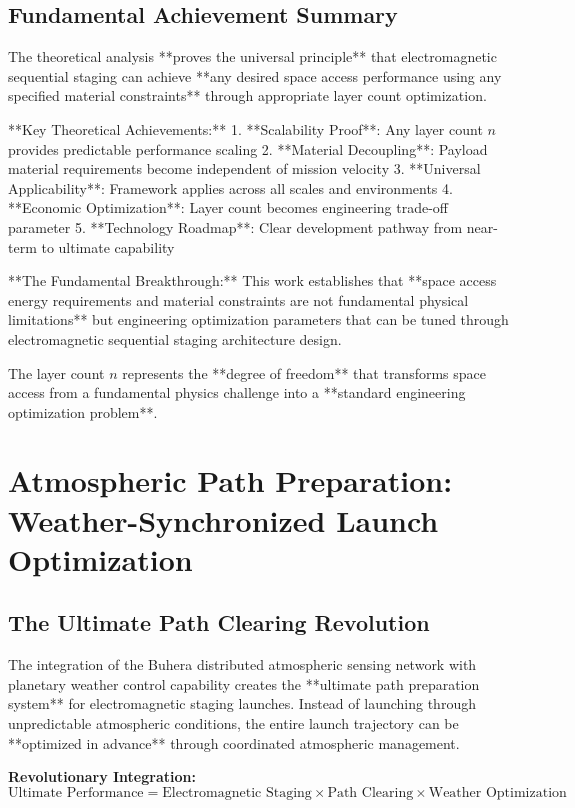 \documentclass[12pt,a4paper]{article}
\begin{document}
\subsection{Fundamental Achievement Summary}

The theoretical analysis **proves the universal principle** that electromagnetic sequential staging can achieve **any desired space access performance using any specified material constraints** through appropriate layer count optimization.

**Key Theoretical Achievements:**
1. **Scalability Proof**: Any layer count $n$ provides predictable performance scaling
2. **Material Decoupling**: Payload material requirements become independent of mission velocity
3. **Universal Applicability**: Framework applies across all scales and environments
4. **Economic Optimization**: Layer count becomes engineering trade-off parameter
5. **Technology Roadmap**: Clear development pathway from near-term to ultimate capability

**The Fundamental Breakthrough:**
This work establishes that **space access energy requirements and material constraints are not fundamental physical limitations** but engineering optimization parameters that can be tuned through electromagnetic sequential staging architecture design.

The layer count $n$ represents the **degree of freedom** that transforms space access from a fundamental physics challenge into a **standard engineering optimization problem**.

\section{Atmospheric Path Preparation: Weather-Synchronized Launch Optimization}

\subsection{The Ultimate Path Clearing Revolution}

The integration of the Buhera distributed atmospheric sensing network with planetary weather control capability creates the **ultimate path preparation system** for electromagnetic staging launches. Instead of launching through unpredictable atmospheric conditions, the entire launch trajectory can be **optimized in advance** through coordinated atmospheric management.

\textbf{Revolutionary Integration:}
\begin{equation}
\text{Ultimate Performance} = \text{Electromagnetic Staging} \times \text{Path Clearing} \times \text{Weather Optimization}
\end{equation}
\end{document}
